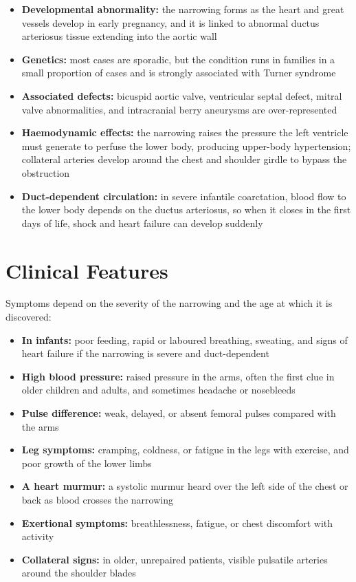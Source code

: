 \begin{itemize}
    \item \textbf{Developmental abnormality:} the narrowing forms as the heart and great vessels develop in early pregnancy, and it is linked to abnormal ductus arteriosus tissue extending into the aortic wall
    \item \textbf{Genetics:} most cases are sporadic, but the condition runs in families in a small proportion of cases and is strongly associated with Turner syndrome
    \item \textbf{Associated defects:} bicuspid aortic valve, ventricular septal defect, mitral valve abnormalities, and intracranial berry aneurysms are over-represented
    \item \textbf{Haemodynamic effects:} the narrowing raises the pressure the left ventricle must generate to perfuse the lower body, producing upper-body hypertension; collateral arteries develop around the chest and shoulder girdle to bypass the obstruction
    \item \textbf{Duct-dependent circulation:} in severe infantile coarctation, blood flow to the lower body depends on the ductus arteriosus, so when it closes in the first days of life, shock and heart failure can develop suddenly
\end{itemize}

\section*{Clinical Features}
Symptoms depend on the severity of the narrowing and the age at which it is discovered:

\begin{itemize}
    \item \textbf{In infants:} poor feeding, rapid or laboured breathing, sweating, and signs of heart failure if the narrowing is severe and duct-dependent
    \item \textbf{High blood pressure:} raised pressure in the arms, often the first clue in older children and adults, and sometimes headache or nosebleeds
    \item \textbf{Pulse difference:} weak, delayed, or absent femoral pulses compared with the arms
    \item \textbf{Leg symptoms:} cramping, coldness, or fatigue in the legs with exercise, and poor growth of the lower limbs
    \item \textbf{A heart murmur:} a systolic murmur heard over the left side of the chest or back as blood crosses the narrowing
    \item \textbf{Exertional symptoms:} breathlessness, fatigue, or chest discomfort with activity
    \item \textbf{Collateral signs:} in older, unrepaired patients, visible pulsatile arteries around the shoulder blades
\end{itemize}


